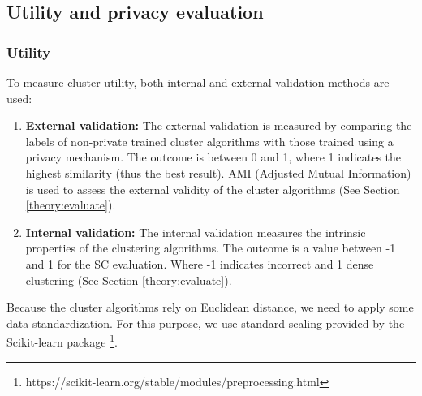 \subsection{Utility and privacy evaluation}
\subsubsection*{Utility}
To measure cluster utility, both internal and external validation methods are used:
{}
\begin{enumerate}
      \item \textbf{External validation: }
            The external validation is measured by comparing the labels of non-private trained cluster algorithms with those trained using a privacy mechanism.
            The outcome is between 0 and 1, where 1 indicates the highest similarity (thus the best result).
            AMI (Adjusted Mutual Information) is used to assess the external validity of the cluster algorithms (See Section \ref{theory:evaluate}).
      \item \textbf{Internal validation: }
            The internal validation measures the intrinsic properties of the clustering algorithms.
            The outcome is a value between -1 and 1 for the SC evaluation.
            Where -1 indicates incorrect and 1 dense clustering (See Section \ref{theory:evaluate}).
\end{enumerate}
Because the cluster algorithms rely on Euclidean distance, we need to apply some data standardization.
For this purpose, we use standard scaling provided by the Scikit-learn package \footnote{https://scikit-learn.org/stable/modules/preprocessing.html}.

